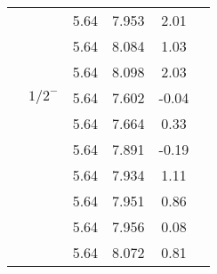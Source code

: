 \documentclass[prd,twocolumn,floatfix,nofootinbib]{revtex4}
\begin{document}
\begin{table*}[!htbp]
\begin{tabular}{cccccc}
                         &$ $     &5.64   &7.953 &2.01  \\
                         &$ $     &5.64   &8.084 &1.03 \\
                         &$ $     &5.64   &8.098 &2.03  \\
            &${1/2}^{-}$     &5.64   &7.602 &-0.04 \\
                         &$ $     &5.64   &7.664 &0.33  \\
                         &$ $     &5.64   &7.891 &-0.19  \\
                         &$ $     &5.64   &7.934 &1.11 \\
                         &$ $     &5.64   &7.951 &0.86  \\
                         &$ $     &5.64   &7.956 &0.08  \\
                         &$ $     &5.64   &8.072 &0.81 \\                        
       \hline\hline
    \end{tabular}
\end{table*}
\end{document}
